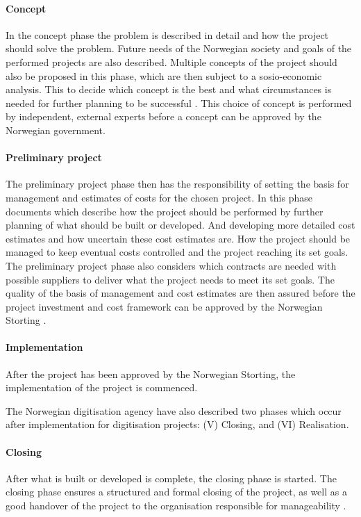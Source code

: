 \paragraph{Concept}
In the concept phase the problem is described in detail and how the project should solve the problem. Future needs of the Norwegian society and goals of the performed projects are also described. Multiple concepts of the project should also be proposed in this phase, which are then subject to a sosio-economic analysis. This to decide which concept is the best and what circumstances is needed for further planning to be successful \cite{project_wizard_r_2019}. This choice of concept is performed by independent, external experts before a concept can be approved by the Norwegian government.

\paragraph{Preliminary project}
The preliminary project phase then has the responsibility of setting the basis for management and estimates of costs for the chosen project. In this phase documents which describe how the project should be performed by further planning of what should be built or developed. And developing more detailed cost estimates and how uncertain these cost estimates are. How the project should be managed to keep eventual costs controlled and the project reaching its set goals. The preliminary project phase also considers which contracts are needed with possible suppliers to deliver what the project needs to meet its set goals. The quality of the basis of management and cost estimates are then assured before the project investment and cost framework can be approved by the Norwegian Storting \cite{project_wizard_r_2019}. 

\paragraph{Implementation}
After the project has been approved by the Norwegian Storting, the implementation of the project is commenced.

The Norwegian digitisation agency have also described two phases which occur after implementation for digitisation projects: (V) Closing, and (VI) Realisation.

\paragraph{Closing}
After what is built or developed is complete, the closing phase is started. The closing phase ensures a structured and formal closing of the project, as well as a good handover of the project to the organisation responsible for manageability \cite{project_wizard_digdir_2023}. 

